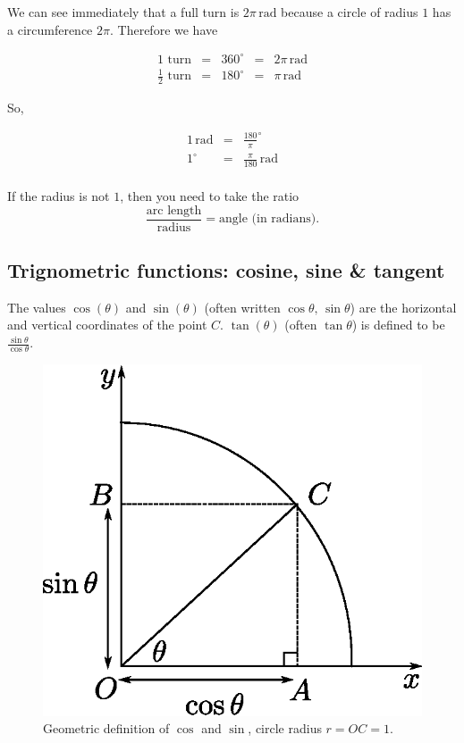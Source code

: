 We can see immediately that a full turn is $2\pi\,\mbox{rad}$ because a circle of radius $1$ has a circumference $2\pi$. Therefore we have
\begin{in_a_box}
$$\begin{array}{rcccl}
1\text{ turn}&=&360^{\circ}&=&2\pi\,\mbox{rad}\\
\frac{1}{2}\text{ turn}&=&180^{\circ}&=&\pi\,\mbox{rad}
\end{array}$$
\end{in_a_box}
So,
\begin{in_a_box}
\begin{eqnarray*}
1\,\mbox{rad}&=&\frac{180}{\pi}^{\circ}\\
1^{\circ}&=&\frac{\pi}{180}\,\mbox{rad}\\
\end{eqnarray*}
\end{in_a_box}
If the radius is not $1$, then you need to take the ratio 
\begin{equation}
\frac{\text{arc length}}{\text{radius}} = \text{angle (in radians)}.
\end{equation}

\subsection{Trignometric functions: cosine, sine \& tangent}\label{trig-functions}
\begin{definition}
The values $\cos(\theta)$ and $\sin(\theta)$ (often written $\cos\theta,\, \sin\theta$) are the horizontal and vertical coordinates of the point $C$. $\tan(\theta)$ (often $\tan\theta$) is defined to be $\frac{\sin\theta}{\cos\theta}$.

\begin{figure}[H]
\centering
\includegraphics[scale=0.75]{img/cos-sin}
\caption{Geometric definition of $\cos$ and $\sin$, circle radius $r=OC=1$.}
\label{fig:cos-sin}
\end{figure}

\end{definition}

